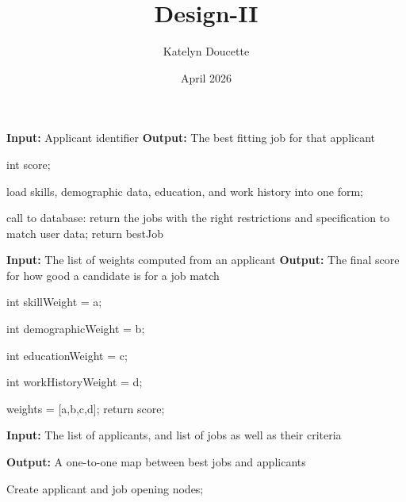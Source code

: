 \documentclass{article}
\title{Design-II}
\author{Katelyn Doucette}
\date{April 2026}
\begin{document}
\maketitle

\begin{algorithm}
\caption{The \textbf{findNearestFitJob()} function}
\textbf{Input:} Applicant identifier
\textbf{Output:} The best fitting job for that applicant

int score;


load skills, demographic data, education, and work history into one form;


call to database: return the jobs with the right restrictions and specification to match user data;
return bestJob
\end{algorithm}

\begin{algorithm}
\caption{The \textbf{matchCriteriaToScore()} function}
\textbf{Input:} The list of weights computed from an applicant
\textbf{Output:} The final score for how good a candidate is for a job match

int skillWeight = a;

int demographicWeight = b;

int educationWeight = c;

int workHistoryWeight = d;

weights = [a,b,c,d];
return score;
\end{algorithm}

\begin{algorithm}
\caption{The \textbf{matchApplicantsToJobs()} function}
\textbf{Input:} The list of applicants, and list of jobs as well as their criteria

\textbf{Output:} A one-to-one map between best jobs and applicants

Create applicant and job opening nodes;


	
\end{algorithm}
\end{document}
